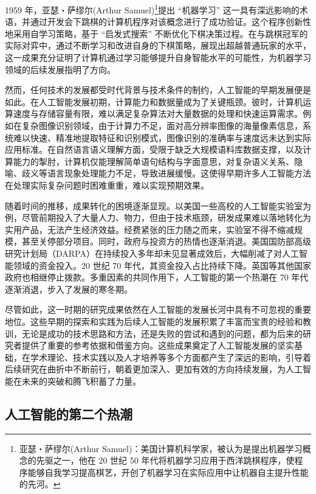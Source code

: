 1959 年，亚瑟・萨缪尔(Arthur Samuel)\footnote{亚瑟・萨缪尔(Arthur Samuel)：美国计算机科学家，被认为是提出机器学习概念的先驱之一，他在 20 世纪 50 年代将机器学习应用于西洋跳棋程序，使程序能够自我学习提高棋艺，开创了机器学习在实际应用中让机器自主提升性能的先河。}提出 “机器学习” 这一具有深远影响的术语，并通过开发会下跳棋的计算机程序对该概念进行了成功验证。这个程序创新性地采用自学习策略，基于 “启发式搜索” 不断优化下棋决策过程。在与跳棋冠军的实际对弈中，通过不断学习和改进自身的下棋策略，展现出超越普通玩家的水平，这一成果充分证明了计算机通过学习能够提升自身智能水平的可能性，为机器学习领域的后续发展指明了方向。


然而，任何技术的发展都受时代背景与技术条件的制约，人工智能的早期发展便是如此。在人工智能发展初期，计算能力和数据量成为了关键瓶颈。彼时，计算机运算速度与存储容量有限，难以满足复杂算法对大量数据的处理和快速运算需求。例如在复杂图像识别领域，由于计算力不足，面对高分辨率图像的海量像素信息，系统难以快速、精准地提取特征和识别模式，图像识别的准确率与速度远未达到实际应用标准。在自然语言语义理解方面，受限于缺乏大规模语料库数据支撑，以及计算能力的掣肘，计算机仅能理解简单语句结构与字面意思，对复杂语义关系、隐喻、歧义等语言现象处理能力不足，导致进展缓慢。这使得早期许多人工智能方法在处理实际复杂问题时困难重重，难以实现预期效果。


随着时间的推移，成果转化的困境逐渐显现。以美国一些高校的人工智能实验室为例，尽管前期投入了大量人力、物力，但由于技术瓶颈，研发成果难以落地转化为实用产品，无法产生经济效益。经费紧张的压力随之而来，实验室不得不缩减规模，甚至关停部分项目。同时，政府与投资方的热情也逐渐消退。美国国防部高级研究计划局（DARPA）在持续投入多年却未见显著成效后，大幅削减了对人工智能领域的资金投入。20 世纪 70 年代，其资金投入占比持续下降。英国等其他国家政府也相继停止拨款。多重因素的共同作用下，人工智能的第一个热潮在 70 年代逐渐消退，步入了发展的寒冬期。


尽管如此，这一时期的研究成果依然在人工智能的发展长河中具有不可忽视的重要地位。这些早期的探索和实践为后续人工智能的发展积累了丰富而宝贵的经验和教训，无论是成功的技术思路和方法，还是失败的尝试和遇到的问题，都为后来的研究者提供了重要的参考依据和借鉴方向。这些成果奠定了人工智能发展的坚实基础，在学术理论、技术实践以及人才培养等多个方面都产生了深远的影响，引导着后续研究在曲折中不断前行，朝着更加深入、更加有效的方向持续发展，为人工智能在未来的突破和腾飞积蓄了力量。



\subsection{人工智能的第二个热潮}


